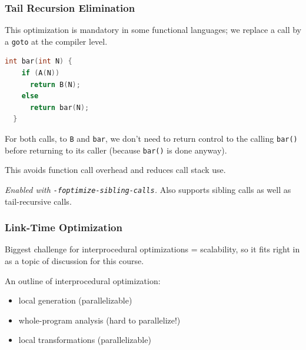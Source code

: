 \begin{frame}[fragile]
\frametitle{Tail Recursion Elimination}

This optimization is mandatory in some functional languages; we replace a call by a {\tt goto} at the compiler level.

{\small
\begin{lstlisting}[language=C]
  int bar(int N) {
    if (A(N))
      return B(N);
    else
      return bar(N);
  }
\end{lstlisting}
}

For both calls, to {\tt B} and {\tt bar}, we don't need to return control
to the calling {\tt bar()} before returning to its caller (because {\tt bar()}
is done anyway). 

This avoids function call overhead and reduces call stack use.

\noindent \emph{Enabled with {\tt -foptimize-sibling-calls}.} Also supports
sibling calls as well as tail-recursive calls.

\end{frame}

\begin{frame}
\frametitle{Link-Time Optimization}

\begin{changemargin}{1.5cm}
Biggest challenge for interprocedural optimizations = scalability, so 
it fits right in as a topic of discussion for this course.

An outline of interprocedural optimization:\\[-.5em]
\begin{itemize}
\item local generation (parallelizable)
\item whole-program analysis (hard to parallelize!)
\item local transformations (parallelizable)
\end{itemize}
\end{changemargin}
\end{frame}


